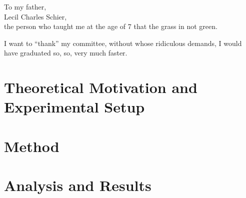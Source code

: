\documentclass[11pt]{ucthesis}
\begin{document}
\begin{frontmatter}
\begin{dedication}
\null\vfil
{\large
\begin{center}
To my father,\\\vspace{12pt}
Lecil Charles Schier,\\\vspace{12pt}
the person who taught me at the age of 7 that the grass in not green.
\end{center}}
\vfil\null
\end{dedication}


\begin{acknowledgements}
I want to ``thank'' my committee, without whose ridiculous demands, I
would have graduated so, so, very much faster.
\end{acknowledgements}

\end{frontmatter}


\part{Theoretical Motivation and Experimental Setup}


\part{Method}





\part{Analysis and Results}






\nocite{*}


\iffalse
\appendix



Ancillary material should be put in appendices, which appear after the
bibliography. 
\fi
\end{document}

